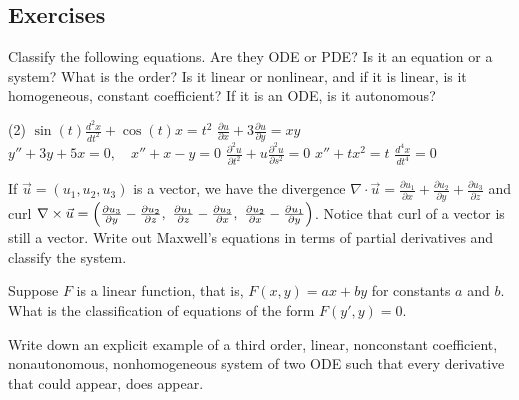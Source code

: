 \subsection{Exercises}

\begin{exercise}
Classify the following equations.  Are they ODE or PDE?  Is it an equation
or a system?  What is the order?  Is it linear or nonlinear, and if it is
linear, is it homogeneous, constant coefficient?  If it is an ODE\@, is it
autonomous?
\begin{tasks}(2)
\task $\displaystyle \sin(t) \frac{d^2 x}{dt^2} + \cos(t) x = t^2$
\task $\displaystyle \frac{\partial u}{\partial x} + 3 \frac{\partial u}{\partial y} = xy$
\task $\displaystyle y''+3y+5x=0, \quad x''+x-y=0$
\task $\displaystyle \frac{\partial^2 u}{\partial t^2} + u\frac{\partial^2 u}{\partial s^2} =
0$
\task $\displaystyle x''+tx^2=t$
\task $\displaystyle \frac{d^4 x}{dt^4} = 0$
\end{tasks}
\end{exercise}

\begin{exercise}
If $\vec{u} = (u_1,u_2,u_3)$ is a vector, we have the divergence
$\nabla \cdot \vec{u} =
\frac{\partial u_1}{\partial x} +
\frac{\partial u_2}{\partial y} +
\frac{\partial u_3}{\partial z}$ and curl
$\nabla \times \vec{u} =
\Bigl(
\frac{\partial u_3}{\partial y} - \frac{\partial u_2}{\partial z} , ~
\frac{\partial u_1}{\partial z} - \frac{\partial u_3}{\partial x} , ~
\frac{\partial u_2}{\partial x} - \frac{\partial u_1}{\partial y} \Bigr)$.
Notice that curl of a vector is still a vector.  Write out Maxwell's
equations in terms of partial derivatives and classify the system.
\end{exercise}

\begin{exercise}
Suppose $F$ is a linear function, that is,
$F(x,y) = ax+by$ for constants $a$ and $b$.  What is the
classification of equations of the form $F(y',y) = 0$.
\end{exercise}

\begin{exercise}
Write down an explicit example of a third order, linear, nonconstant coefficient,
nonautonomous, nonhomogeneous system of two ODE such that every derivative
that could appear, does appear.
\end{exercise}

\setcounter{exercise}{100}

